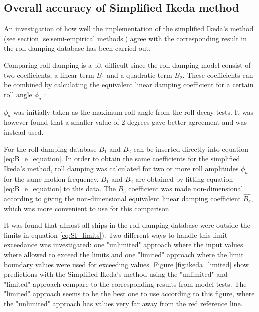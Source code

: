 \subsection{Overall accuracy of Simplified Ikeda method}
\label{se:overall_comparison}
An investigation of how well the implementation of the simplified Ikeda's method (see section \ref{se:semi-empirical methods}) agree with the corresponding result in the roll damping database has been carried out. 

Comparing roll damping is a bit difficult since the roll damping model consist of two coefficients, a linear term $B_1$ and a quadratic term $B_2$. These coefficients can be combined by calculating the equivalent linear damping coefficient for a certain roll angle $\phi_a$ \parencite{himeno_prediction_1981}:


$\phi_a$ was initially taken as the maximum roll angle from the roll decay tests. It was however found that a smaller value of 2 degrees gave better agreement and was instead used.

For the roll damping database $B_1$ and $B_2$ can be inserted directly into equation  \ref{eq:B_e_equation}. 
In order to obtain the same coefficients for the simplified Ikeda's method, roll damping was calculated for two or more roll amplitudes $\phi_a$ for the same motion frequency. $B_1$ and $B_2$ are obtained by fitting equation \ref{eq:B_e_equation} to this data. The $B_e$ coefficient was made non-dimensional according to \parencite{himeno_prediction_1981} giving the non-dimensional equivalent linear damping coefficient $\hat{B_e}$, which was more convenient to use for this comparison. 

It was found that almost all ships in the roll damping database were outside the limits in equation \ref{eq:SI_limits}). Two different ways to handle this limit exceedance was investigated: one "unlimited" approach where the input values where allowed to exceed the limits and one "limited" approach where the limit boundary values were used for exceeding values. Figure \ref{fig:ikeda_limited} show predictions with the Simplified Ikeda's method using the "unlimited" and "limited" approach compare to the corresponding results from model tests. The "limited" approach seems to be the best one to use according to this figure, where the "unlimited" approach has values very far away from the red reference line.   

